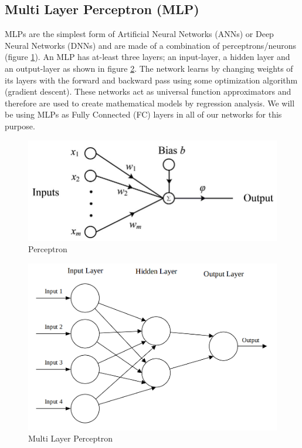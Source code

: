 \subsection{Multi Layer Perceptron (MLP)}
MLPs are the simplest form of Artificial Neural Networks (ANNs) or Deep Neural Networks (DNNs) and are made of a combination of perceptrons/neurons (figure \ref{fig:perceptron}). An MLP has at-least three layers; an input-layer, a hidden layer and an output-layer as shown in figure \ref{fig:mlp}. The network learns by changing weights of its layers with the forward and backward pass using some optimization algorithm (gradient descent). These networks act as universal function approximators \citep{cybenko1989approximation} and therefore are used to create mathematical models by regression analysis. We will be using MLPs as Fully Connected (FC) layers in all of our networks for this purpose.

\begin{figure}
    \centering
    \includegraphics[scale=0.5]{images/fig_chapter2/nns/perceptron.png}
    \caption{Perceptron}
    \label{fig:perceptron}
\end{figure}

\begin{figure}
    \centering
    \includegraphics[scale=0.35]{images/fig_chapter2/nns/mlp.png}
    \caption{Multi Layer Perceptron}
    \label{fig:mlp}
\end{figure}

